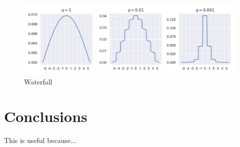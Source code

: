 \documentclass[../main.tex]{subfiles}
\begin{document}
\begin{figure}[ht]
  \centering
  \includegraphics[width=\columnwidth]{figures/Waterfall.png}
  \caption{\label{fig:waterfall} Waterfall}
\end{figure}


\section{Conclusions}
This is useful because... 
\end{document}
